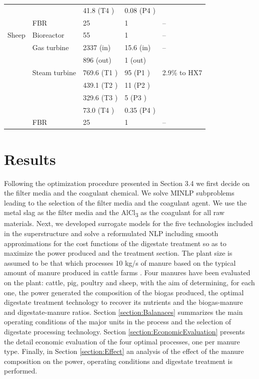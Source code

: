 \begin{refsection}[referencesCh2]
\begin{table}[h!]
\begin{tabular}{@{}lllll@{}}
		&               & 41.8 (T4 )  & 0.08 (P4 ) &              \\
		& FBR           & 25          & 1          & –            \\
		Sheep   & Bioreactor    & 55          & 1          & –            \\
		& Gas turbine   & 2337 (in)   & 15.6 (in)  & –            \\
		&               & 896 (out)   & 1 (out)    &              \\
		& Steam turbine & 769.6 (T1 ) & 95 (P1 )   & 2.9\% to HX7 \\
		&               & 439.1 (T2 ) & 11 (P2 )   &              \\
		&               & 329.6 (T3 ) & 5 (P3 )    &              \\
		&               & 73.0 (T4 )  & 0.35 (P4 ) &              \\
		& FBR           & 25          & 1          & –            \\ \bottomrule
	\end{tabular}
\end{table}

\section{Results} \label{section:Results}
Following the optimization procedure presented in Section 3.4 we first decide on the filter media and the coagulant chemical. We solve MINLP subproblems leading to the selection of the filter media and the coagulant agent. We use the metal slag as the filter media and the AlCl\textsubscript{3} as the coagulant for all raw materials. Next, we developed surrogate models for the five technologies included in the superstructure and solve a reformulated NLP including smooth approximations for the cost functions of the digestate treatment so as to maximize the power produced and the treatment section. The plant size is assumed to be that which processes 10 kg/s of manure based on the typical amount of manure produced in cattle farms \citep{LeonMsc}. Four manures have been evaluated on the plant: cattle, pig, poultry and sheep, with the aim of determining, for each one, the power generated the composition of the biogas produced, the optimal digestate treatment technology to recover its nutrients and the biogas-manure and digestate-manure ratios. Section \ref{section:Balanaces} summarizes the main operating conditions of the major units in the process and the selection of digestate processing technology. Section \ref{section:EconomicEvaluation} presents the detail economic evaluation of the four optimal processes, one per manure type. Finally, in Section \ref{section:Effect} an analysis of the effect of the manure composition on the power, operating conditions and digestate treatment is performed.



\end{refsection}
